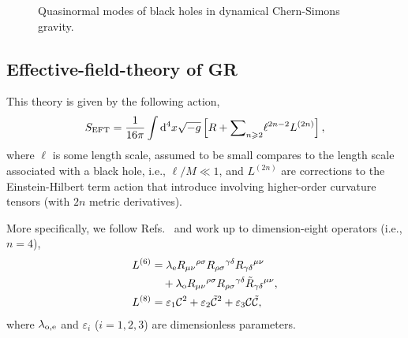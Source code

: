 \documentclass[twocolumn,prd,aps,superscriptaddress,preprintnumbers,tightenlines,showpacs,nofootinbib,eqsecnum,amsfonts,amsmath,longbibliography]{revtex4-1}
\newcommand{\dd}{{\rm d}}
\newcommand{\lame}{\lambda_{\rm e}}
\newcommand{\lamo}{\lambda_{\rm o}}
\begin{document}
\begin{figure}
\caption{Quasinormal modes of black holes in dynamical Chern-Simons gravity.}
\end{figure}

\subsection{Effective-field-theory of GR}

This theory is given by the following action,
%
\begin{equation} \label{eq:action_eft}
    S_{\rm EFT} = \frac{1}{16 \pi}
    \int \dd^4x \sqrt{-g}
    \left[ R
    +
    \footnotesize{\sum}_{n \geqslant 2} \ell^{2n - 2} L^{(2n)}
    \right],
\end{equation}
%
where $\ell$ is some length scale, assumed to be small compares to the length
scale associated with a black hole, i.e., $\ell / M \ll 1$, and
$L^{(2n)}$ are corrections to the Einstein-Hilbert term action that
introduce involving higher-order curvature tensors (with $2n$ metric
derivatives).

More specifically, we follow Refs.~\cite{Cano:2020cao,Cano:2021myl} and work up
to dimension-eight operators (i.e., $n=4$),
%
\begin{subequations}
\label{eq:action_mods}
\begin{align}
    L^{(6)} &= \lame R_{\mu\nu}{}^{\rho\sigma} R_{\rho\sigma}{}^{\gamma\delta} R_{\gamma \delta}{}^{\mu\nu}
    \nonumber \\
            &\quad + \lamo R_{\mu\nu}{}^{\rho\sigma} R_{\rho\sigma}{}^{\gamma\delta} \tilde{R}_{\gamma \delta}{}^{\mu\nu},
    \label{eq:s_6}
    \\
    L^{(8)} &= \varepsilon_{1} \mathcal{C}^2
    + \varepsilon_{2} \tilde{\mathcal{C}}^{2}
    + \varepsilon_{3} \mathcal{C} \tilde{\mathcal{C}},
\label{eq:s_8}
\end{align}
\end{subequations}
%
where $\lambda_{\rm o, e}$ and $\varepsilon_{i}$ ($i=1,2,3$) are dimensionless parameters.
\end{document}
